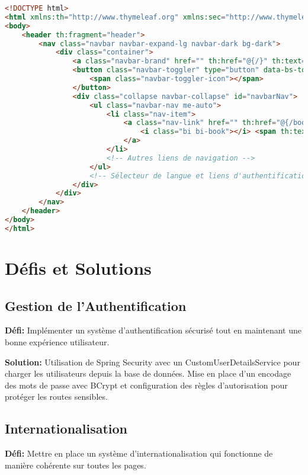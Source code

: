 \documentclass[12pt,a4paper]{report}
\begin{document}
\begin{lstlisting}[language=HTML, caption=Fragment Thymeleaf pour le header]
<!DOCTYPE html>
<html xmlns:th="http://www.thymeleaf.org" xmlns:sec="http://www.thymeleaf.org/extras/spring-security">
<body>
    <header th:fragment="header">
        <nav class="navbar navbar-expand-lg navbar-dark bg-dark">
            <div class="container">
                <a class="navbar-brand" href="" th:href="@{/}" th:text="#{app.title}">Mini Bookstore</a>
                <button class="navbar-toggler" type="button" data-bs-toggle="collapse" data-bs-target="#navbarNav">
                    <span class="navbar-toggler-icon"></span>
                </button>
                <div class="collapse navbar-collapse" id="navbarNav">
                    <ul class="navbar-nav me-auto">
                        <li class="nav-item">
                            <a class="nav-link" href="" th:href="@{/books}">
                                <i class="bi bi-book"></i> <span th:text="#{nav.books}">Livres</span>
                            </a>
                        </li>
                        <!-- Autres liens de navigation -->
                    </ul>
                    <!-- Sélecteur de langue et liens d'authentification -->
                </div>
            </div>
        </nav>
    </header>
</body>
</html>
\end{lstlisting}

\chapter{Défis et Solutions}

\section{Gestion de l'Authentification}
\textbf{Défi:} Implémenter un système d'authentification sécurisé tout en maintenant une bonne expérience utilisateur.

\textbf{Solution:} Utilisation de Spring Security avec un CustomUserDetailsService pour charger les utilisateurs depuis la base de données. Mise en place d'un encodage des mots de passe avec BCrypt et configuration des règles d'autorisation pour protéger les routes sensibles.

\section{Internationalisation}
\textbf{Défi:} Mettre en place un système d'internationalisation qui fonctionne de manière cohérente sur toutes les pages.
\end{document}

